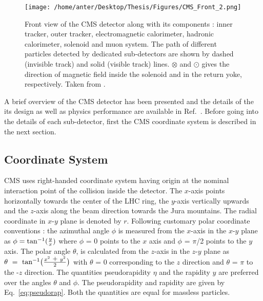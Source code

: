 \begin{figure}[!h]
\begin{center} 
\hspace*{-15mm}
\texttt{[image: /home/anter/Desktop/Thesis/Figures/CMS\_Front\_2.png]}
\caption{Front view of the CMS detector along with its components : inner tracker, outer tracker, electromagnetic calorimeter, hadronic calorimeter, solenoid and muon system. The path of different particles detected by dedicated sub-detectors are shown by dashed (invisible track) and solid (visible track) lines. $\otimes$ and $\odot$ gives the direction of magnetic field inside the solenoid and in the return yoke, respectively. Taken from \cite{Ball:2007zza}.}
\label{fig:CMS_front}
\end{center}
\end{figure}

A brief overview of the CMS detector has been presented and the details of the its design as well as physics performance are available in Ref.~\cite{Bayatian:2006nff,Ball:2007zza}. Before going into the details of each sub-detector, first the CMS coordinate system is described in the next section.

\subsection{Coordinate System}
CMS uses right-handed coordinate system having origin at the nominal interaction point of the collision inside the detector. The $x$-axis points horizontally towards the center of the LHC ring, the $y$-axis vertically upwards and the $z$-axis along the beam direction towards the Jura mountains. The radial coordinate in $x$-$y$ plane is denoted by $r$. Following customary polar coordinate conventions : the azimuthal angle $\phi$ is measured from the $x$-axis in the $x$-$y$ plane as $\phi = {\rm tan^{-1}}(\frac{y}{x})$ where $\phi$ = 0 points to the \plusn $x$ axis and $\phi$ = $\pi$/2 points to the \plusn $y$ axis. The polar angle $\theta$, is calculated from the $z$-axis in the $z$-$y$ plane as $\theta~=~{\rm tan^{-1}}\big(\frac{x^2~\plus y^2}{2}\big)$ with $\theta$ = 0 corresponding to the \plusn $z$ direction and $\theta$ = $\pi$ to the -$z$ direction. The quantities pseudorapidity $\eta$ and the rapidity $y$ are preferred over the angles $\theta$ and $\phi$. The pseudorapidity and rapidity are given by Eq.~\ref{eq:pseudorap}. Both the quantities are equal for massless particles.

